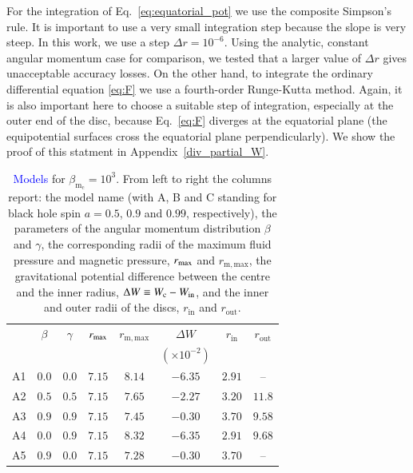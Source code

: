 \documentclass{aa}
\newcommand{\sg}[1]{\textcolor{blue}{#1}}
\begin{document}
For the integration of Eq.~\eqref{eq:equatorial_pot} we use the composite Simpson's rule. It is important to use a very small integration step because the slope is very steep. In this work, we use a step $\Delta r = 10^{-6}$. Using the analytic, constant angular momentum case for comparison, we tested that 
a larger value of $\Delta r$ gives unacceptable accuracy losses. On the other hand, to integrate the ordinary differential equation \eqref{eq:F} we use a fourth-order Runge-Kutta method. Again, it is also important here to choose a suitable step of integration, especially at the outer end of the disc, because Eq.~\eqref{eq:F} diverges at the equatorial plane (the equipotential surfaces cross the equatorial plane perpendicularly). We show the proof of this statment in Appendix~\ref{div_partial_W}.

\begin{table}
\caption{\sg{Models} for $\beta_{\mathrm{m}_{\mathrm{c}}} = 10^{3}$. From left to right the columns report: the model name (with A, B and C standing for black hole spin $a = 0.5$, $0.9$ and $0.99$, respectively), the parameters of the angular momentum distribution $\beta$ and $\gamma$, the corresponding radii of the maximum fluid pressure and magnetic pressure, $r_{{\rm{max}}}$ and $r_{{\mathrm{m, max}}}$, the gravitational potential difference between the centre and the inner radius, $\Delta W\equiv W_{\rm c}-W_{\rm in}$, and the inner and outer radii of the discs, $r_{\mathrm{in}}$ and $r_{\mathrm{out}}$.}             
\label{table:1}      
\centering          
\begin{tabular}{c c c c  c c c c}
\hline\hline       
 & $\beta$ & $\gamma$ & $r_{\rm{max}}$ &  $r_{\mathrm{m, max}}$ & $\Delta W$               & $r_{\mathrm{in}}$ & $r_{\mathrm{out}}$ \\ 
 &              &                   &                          &                                        & $(\times 10^{-2})$     &                              &  \\
\hline           
A1 & $0.0$ & $0.0$ & $7.15$ &  $8.14$  & $-6.35$ & $2.91$ & -- \\ 
A2 & $0.5$ & $0.5$ & $7.15$ &  $7.65$  & $-2.27$ & $3.20$ & $11.8$\\ 
A3 & $0.9$ & $0.9$ & $7.15$ &  $7.45$  & $-0.30$ & $3.70$ &  $9.58$\\ 
A4 & $0.0$ & $0.9$ & $7.15$ &  $8.32$  & $-6.35$ & $2.91$ & $9.68$\\ 
A5 & $0.9$ & $0.0$ & $7.15$ &  $7.28$  & $-0.30$ & $3.70$ & --\\ 

\end{tabular}
\end{table}
\end{document}

